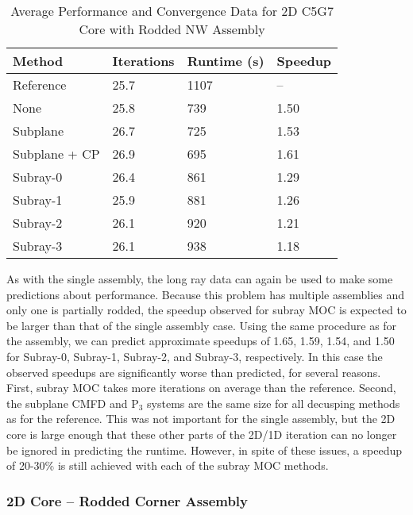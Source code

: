 \begin{table}[h]
    \centering
    \caption{Average Performance and Convergence Data for 2D C5G7 Core with Rodded NW Assembly}\label{t:subray-performance-2dcoreNW}
    \begin{tabular}{l l l l}\toprule
        Method & Iterations & Runtime (s) & Speedup \\\midrule
Reference     & 25.7 & 1107 & --  \\
None          & 25.8 & 739 & 1.50 \\ 
Subplane      & 26.7 & 725 & 1.53 \\ 
Subplane + CP & 26.9 & 695 & 1.61 \\
Subray-0      & 26.4 & 861 & 1.29 \\ 
Subray-1      & 25.9 & 881 & 1.26 \\ 
Subray-2      & 26.1 & 920 & 1.21 \\ 
Subray-3      & 26.1 & 938 & 1.18 \\ 
        \bottomrule
    \end{tabular}
\end{table}

As with the single assembly, the long ray data can again be used to make some predictions about performance.  Because this problem has multiple assemblies and only one is partially rodded, the speedup observed for subray MOC is expected to be larger than that of the single assembly case.  Using the same procedure as for the assembly, we can predict approximate speedups of 1.65, 1.59, 1.54, and 1.50 for Subray-0, Subray-1, Subray-2, and Subray-3, respectively.  In this case the observed speedups are significantly worse than predicted, for several reasons.  First, subray MOC takes more iterations on average than the reference.  Second, the subplane CMFD and P$_3$ systems are the same size for all decusping methods as for the reference.  This was not important for the single assembly, but the 2D core is large enough that these other parts of the 2D/1D iteration can no longer be ignored in predicting the runtime.  However, in spite of these issues, a speedup of 20-30\% is still achieved with each of the subray MOC methods.

\subsubsection{2D Core -- Rodded Corner Assembly}

